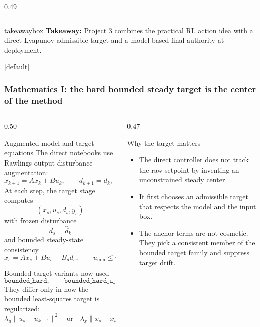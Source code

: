 \documentclass[aspectratio=169]{beamer}
\newcommand{\takeawaybox}[1]{%
\vspace{0.01cm}
\begin{center}
\begin{beamercolorbox}[wd=0.94\textwidth,sep=3pt,center,rounded=true,shadow=false]{takeawaybox}
\scriptsize
\textbf{\textcolor{maroon1}{Takeaway:}} #1
\end{beamercolorbox}
\end{center}
}
\begin{document}
\begin{frame}
\begin{columns}[T,onlytextwidth]
\begin{column}{0.49\textwidth}
\end{column}
\end{columns}

\takeawaybox{Project 3 combines the practical RL action idea with a direct Lyapunov admissible target and a model-based final authority at deployment.}

\end{frame}

\begin{frame}
[default]
\frametitle{\large \textbf{Mathematics I: the hard bounded steady target is the center of the method}}
\scriptsize
\vspace{-0.30cm}

\begin{columns}[T,onlytextwidth]

\begin{column}{0.50\textwidth}
\begin{block}{Augmented model and target equations}
\justifying
The direct notebooks use Rawlings output-disturbance augmentation:
\[
x_{k+1}=Ax_k+Bu_k,\qquad d_{k+1}=d_k,\qquad y_k=Cx_k+d_k.
\]
At each step, the target stage computes
\[
(x_s,u_s,d_s,y_s)
\]
with frozen disturbance
\[
d_s=\hat d_k
\]
and bounded steady-state consistency
\[
x_s=Ax_s+Bu_s+B_d d_s,\qquad
u_{\min}\le u_s\le u_{\max}.
\]
\end{block}

\vspace{0.02cm}

\begin{block}{Bounded target variants now used}
\justifying
\[
\texttt{bounded\_hard},\qquad
\texttt{bounded\_hard\_u\_prev\_0p1},\qquad
\texttt{bounded\_hard\_xs\_prev\_0p1}.
\]
They differ only in how the bounded least-squares target is regularized:
\[
\lambda_u\|u_s-u_{k-1}\|^2
\quad \text{or} \quad
\lambda_x\|x_s-x_{s,\mathrm{prev}}\|^2.
\]
\end{block}
\end{column}

\begin{column}{0.47\textwidth}
\begin{block}{Why the target matters}
\begin{itemize}\justifying
  \setlength{\itemsep}{0.28ex}
  \item The direct controller does not track the raw setpoint by inventing an unconstrained steady center.
  \item It first chooses an admissible target that respects the model and the input box.
  \item The anchor terms are not cosmetic. They pick a consistent member of the bounded target family and suppress target drift.
\end{itemize}
\end{block}


\end{column}
\end{columns}
\end{frame}
\end{document}
